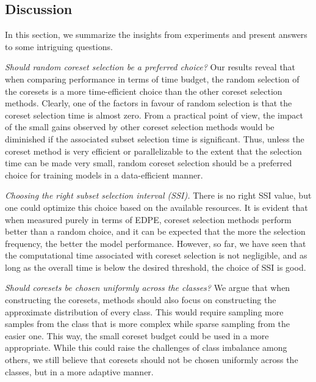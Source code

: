 \subsection{Discussion}
In this section, we summarize the insights from experiments and present answers to some intriguing questions.


\textit{Should random coreset selection be a preferred choice? }Our results reveal that when comparing performance in terms of time budget, the random selection of the coresets is a more time-efficient choice than the other coreset selection methods. Clearly, one of the factors in favour of random selection is that the coreset selection time is almost zero. From a practical point of view, the impact of the small gains observed by other coreset selection methods would be diminished if the associated subset selection time is significant. Thus, unless the coreset method is very efficient or parallelizable to the extent that the selection time can be made very small, random coreset selection should be a preferred choice for training models in a data-efficient manner.

\textit{Choosing the right subset selection interval (SSI). }There is no right SSI value, but one could optimize this choice based on the available resources. It is evident that when measured purely in terms of EDPE, coreset selection methods perform better than a random choice, and it can be expected that the more the selection frequency, the better the model performance. However, so far, we have seen that the computational time associated with coreset selection is not negligible, and as long as the overall time is below the desired threshold, the choice of SSI is good.



\textit{Should coresets be chosen uniformly across the classes?}
We argue that when constructing the coresets, methods should also focus on constructing the approximate distribution of every class. This would require sampling more samples from the class that is more complex while sparse sampling from the easier one. This way, the small coreset budget could be used in a more appropriate. While this could raise the challenges of class imbalance among others, we still believe that coresets should not be chosen uniformly across the classes, but in a more adaptive manner.




